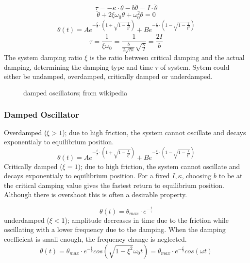 \documentclass[\main/master.tex]{subfiles}
\begin{document}
\begin{equation}
\tau = -\kappa\cdot\theta - b\dot{\theta}  = I\cdot\ddot{\theta}   \label{eqn:damped_motion_equation}
\end{equation} 
\begin{equation}
\ddot{\theta} + 2\xi\omega_0\dot{\theta} + \omega_0^2\theta = 0   \label{eqn:damped_motion_equation}
\end{equation}
\begin{equation}
\theta(t) = Ae^{-\frac{t}{\tau}\cdot(1+\sqrt{1-\frac{1}{\xi^2}})} + Be^{-\frac{t}{\tau}\cdot(1-\sqrt{1-\frac{1}{\xi^2}})}    \label{eqn:damped_motion_equation}
\end{equation}
\begin{equation}
\tau = \frac{1}{\xi\omega_0} = \frac{1}{\frac{b}{2\sqrt{I\kappa}}\sqrt{\frac{\kappa}{I}} }= \frac{2I}{b}  \label{eqn:damping_time}
\end{equation}
The system damping ratio $\xi$ is the ratio between critical damping and the actual damping, determining the damping type and time $\tau$ of system. Sytem could either be undamped, overdamped, critically damped or underdamped.
\begin{figure}[htbp]
	\centering
	\caption[damped]{damped oscillators; from wikipedia}
	\label{fig:damped_oscillators}
\end{figure}

\newpage
\subsubsection{Damped Oscillator}

Overdamped ($\xi > 1$); due to high friction, the system cannot oscillate and decays exponentialy to equilibrium position. 
\begin{equation}
\theta(t) = Ae^{-\frac{t}{\tau}\cdot(1+\sqrt{1-\frac{1}{\xi^2}})} + Be^{-\frac{t}{\tau}\cdot(1-\sqrt{1-\frac{1}{\xi^2}})}    \label{eqn:overdamped_motion_equation}
\end{equation}
Critically damped ($\xi = 1$); due to high friction, the system cannot oscillate and decays exponentialy to equilibrium position. For a fixed $I, \kappa$, choosing $b$ to be at the critical damping value gives
the fastest return to equilibrium position. Although there is overshoot this is often a desirable property.

\begin{equation}
\theta(t) = \theta_{max}\cdot e^{-\frac{t}{\tau}}     \label{eqn:underdamped_motion_equation}
\end{equation}
 underdamped ($\xi < 1$); amplitude decreases in time due to the friction while oscillating with a lower frequency due to the damping. When the damping coefficient is small enough, the frequency change is neglected.
\begin{equation}
\theta(t) = \theta_{max}\cdot e^{-\frac{t}{\tau}}cos(\sqrt{1-\xi^2}\omega_0 t ) =  \theta_{max}\cdot e^{-\frac{t}{\tau}}cos(\omega t )    \label{eqn:underdamped_motion_equation}
\end{equation}
\end{document}
